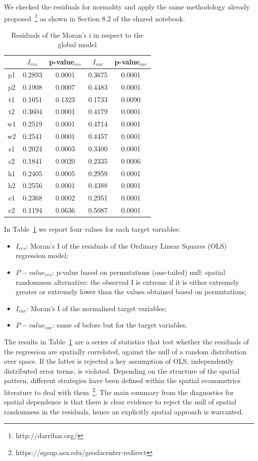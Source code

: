 \documentclass[12pt]{article}
\begin{document}
We  checked the residuals for normality and apply the same methodology already proposed~\footnote{http://darribas.org/} as shown in Section 8.2 of the shared notebook.

\begin{table}[h!]
\centering
\caption{Residuals of the Moran's i in respect to the global model}
\label{tab:residuals}
\begin{tabular}{ccccc}
\hline
   & $I_{res}$  & p-value$_{res}$ & $I_{var}$  & p-value$_{var}$ \\
\hline
p1	&0.2893	&0.0001	&0.3675	&0.0001  \\
p2	&0.1908	&0.0007	&0.4483	&0.0001 \\
t1	&0.1051	&0.1323	&0.1733	&0.0090\\
t2	&0.3604	&0.0001	&0.4179	&0.0001\\
w1&	0.2519	&0.0001	&0.4714	&0.0001\\
w2&	0.2541	&0.0001	&0.4457	&0.0001\\
s1&	0.2024	&0.0003	&0.3400	&0.0001\\
s2	&0.1841	&0.0020	&0.2335	&0.0006\\
h1	&0.2405	&0.0005	&0.2959	&0.0001\\
h2&	0.2556	&0.0001	&0.4388	&0.0001\\
e1&	0.2368	&0.0002	&0.2951	&0.0001\\
e2&	0.1194	&0.0636	&0.5087	&0.0001
\end{tabular}
\end{table}

In Table~\ref{tab:residuals} we report four values for each target variables:
\begin{itemize}
\item  $I_{res}$: Moran's I of the residuals of the Ordinary Linear Squares (OLS) regression model;
\item $P-value_{res}$: p-value based on permutations (one-tailed) null: spatial randomness alternative: the observed I is extreme if it is either extremely greater or extremely lower than the values obtained based on permutations;
\item $I_{var}$: Moran's I of the normalized target variables;
\item $P-value_{var}$: same of before but for the target variables.
\end{itemize}

The results in Table~\ref{tab:residuals} are a series of statistics that test whether the residuals of the regression are spatially correlated, against the null of a random distribution over space.  If the latter is rejected a key assumption of OLS, independently distributed error terms, is violated. Depending on the structure of the spatial pattern, different strategies have been defined within the spatial econometrics literature to deal with them~\footnote{https://sgsup.asu.edu/geodacenter-redirect}. The main summary from the diagnostics for spatial dependence is that there is clear evidence to reject the null of spatial randomness in the residuals, hence an explicitly spatial approach is warranted.
\end{document}
